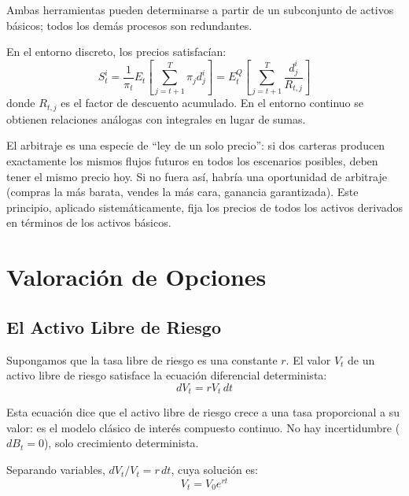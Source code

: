 \documentclass[12pt]{article}
\begin{document}
Ambas herramientas pueden determinarse a partir de un subconjunto de activos b\'asicos; todos los dem\'as procesos son redundantes.

En el entorno discreto, los precios satisfac\'ian:
\[
  S_t^i = \frac{1}{\pi_t} E_t\!\left[\sum_{j=t+1}^{T} \pi_j d_j^i\right] = E_t^Q\!\left[\sum_{j=t+1}^{T} \frac{d_j^i}{R_{t,j}}\right]
\]
donde $R_{t,j}$ es el factor de descuento acumulado. En el entorno continuo se obtienen relaciones an\'alogas con integrales en lugar de sumas.

\begin{intuicion}
El arbitraje es una especie de ``ley de un solo precio'': si dos carteras producen exactamente los mismos flujos futuros en todos los escenarios posibles, deben tener el mismo precio hoy. Si no fuera as\'i, habr\'ia una oportunidad de arbitraje (compras la m\'as barata, vendes la m\'as cara, ganancia garantizada). Este principio, aplicado sistem\'aticamente, fija los precios de todos los activos derivados en t\'erminos de los activos b\'asicos.
\end{intuicion}

\section{Valoraci\'on de Opciones}

\subsection{El Activo Libre de Riesgo}

Supongamos que la tasa libre de riesgo es una constante $r$. El valor $V_t$ de un activo libre de riesgo satisface la ecuaci\'on diferencial determinista:
\begin{equation}
  dV_t = r V_t \, dt
\end{equation}

\begin{intuicionmat}
Esta ecuaci\'on dice que el activo libre de riesgo crece a una tasa proporcional a su valor: es el modelo cl\'asico de inter\'es compuesto continuo. No hay incertidumbre ($dB_t = 0$), solo crecimiento determinista.
\end{intuicionmat}

Separando variables, $dV_t / V_t = r\,dt$, cuya soluci\'on es:
\begin{equation}
  V_t = V_0 e^{rt}
\end{equation}
\end{document}
